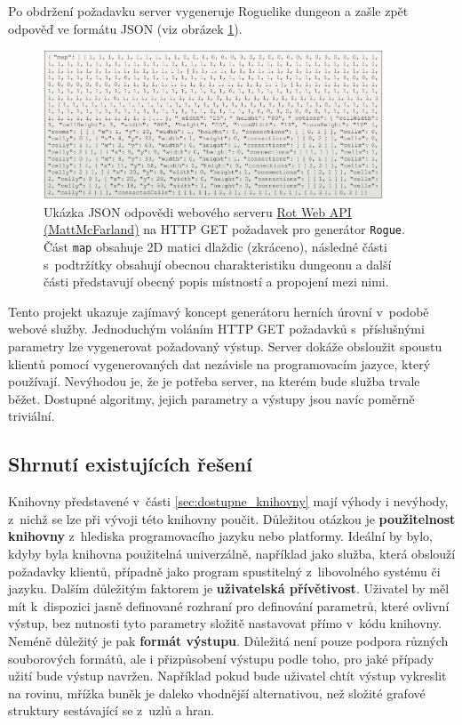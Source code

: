 Po obdržení požadavku server vygeneruje Roguelike dungeon a zašle zpět odpověď ve formátu JSON (viz obrázek \ref{img:dunglib_mattmcfarland}).
\begin{figure}[hbt]
    \centering
    \includegraphics[width=0.90\textwidth]{obrazky/dunglib_mattmcfarland.pdf}
    \caption{Ukázka JSON odpovědi webového serveru  \href{https://github.com/MattMcFarland/rot-web-api}{Rot Web API (MattMcFarland)} na HTTP GET požadavek pro generátor \texttt{Rogue}. Část \texttt{map} obsahuje 2D matici dlaždic (zkráceno), následné části s~podtržítky obsahují obecnou charakteristiku dungeonu a další části představují obecný popis místností a propojení mezi nimi.}
    \label{img:dunglib_mattmcfarland}
\end{figure}
\par
Tento projekt ukazuje zajímavý koncept generátoru herních úrovní v~podobě webové služby.
Jednoduchým voláním HTTP GET požadavků s~příslušnými parametry lze vygenerovat požadovaný výstup.
Server dokáže obsloužit spoustu klientů pomocí vygenerovaných dat nezávisle na programovacím jazyce, který používají.
Nevýhodou je, že je potřeba server, na kterém bude služba trvale běžet.
Dostupné algoritmy, jejich parametry a výstupy jsou navíc poměrně triviální.


\subsection{Shrnutí existujících řešení}


Knihovny představené v~části \ref{sec:dostupne_knihovny} mají výhody i nevýhody, z~nichž se lze při vývoji této knihovny poučit.
Důležitou otázkou je \textbf{použitelnost knihovny} z~hlediska programovacího jazyku nebo platformy.
Ideální by bylo, kdyby byla knihovna použitelná univerzálně, například jako služba, která obslouží požadavky klientů, případně jako program spustitelný z~libovolného systému či jazyku.
Dalším důležitým faktorem je \textbf{uživatelská přívětivost}.
Uživatel by měl mít k~dispozici jasně definované rozhraní pro definování parametrů, které ovlivní výstup, bez nutnosti tyto parametry složitě nastavovat přímo v~kódu knihovny.
Neméně důležitý je pak \textbf{formát výstupu}.
Důležitá není pouze podpora různých souborových formátů, ale i přizpůsobení výstupu podle toho, pro jaké případy užití bude výstup navržen.
Například pokud bude uživatel chtít výstup vykreslit na rovinu, mřížka buněk je daleko vhodnější alternativou, než složité grafové struktury sestávající se z~uzlů a hran.

